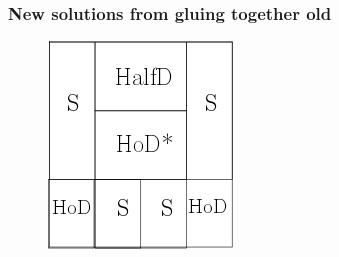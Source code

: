 \documentclass[mathserif, handout]{beamer}
\begin{document}
\begin{frame}
\frametitle{New solutions from gluing together old}
    \begin{figure}
    \begin{minipage}[height=.3\textheight]{.5\textwidth}
    \includegraphics[width=.7\textwidth,height=.3\textheight]{MNG_approxsymbdyn}
    \end{minipage}
    \end{figure}
\end{frame}
\end{document}

